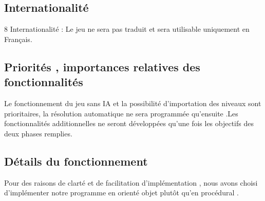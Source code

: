 \documentclass{article}
\begin{document}
		\subsection{Internationalité}
		8 Internationalité :
Le jeu ne sera pas traduit et sera utilisable uniquement en Français.
		\subsection{Priorités , importances relatives des fonctionnalités}
		Le fonctionnement du jeu sans IA et la possibilité d’importation des niveaux
sont prioritaires, la résolution automatique ne sera programmée qu’ensuite .Les
fonctionnalités additionnelles ne seront développées qu’une fois les objectifs des
deux phases remplies.
	\newpage
	\begin{center}
	\section{Détails du fonctionnement}
		\vspace{0.5cm}
		Pour des raisons de clarté et de facilitation d'implémentation , nous avons choisi d'implémenter notre programme en orienté objet plutôt qu'en procédural .
		\end{center}
		\vspace{0.5cm}
\end{document}
